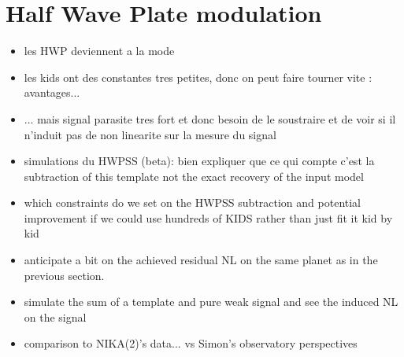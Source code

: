 
\section{Half Wave Plate modulation}

\begin{itemize}
\item les HWP deviennent a la mode
\item les kids ont des constantes tres petites, donc on peut faire tourner vite
  : avantages...
\item ... mais signal parasite tres fort et donc besoin de le soustraire et de
  voir si il n'induit pas de non linearite sur la mesure du signal
\item simulations du HWPSS (beta): bien expliquer que ce qui compte c'est la
  subtraction of this template not the exact recovery of the input model
\item which constraints do we set on the HWPSS subtraction and potential
  improvement if we could use hundreds of KIDS rather than just fit it kid by kid
\item anticipate a bit on the achieved residual NL on the same planet as in the
  previous section.
\item simulate the sum of a template and pure weak signal and see the induced NL
  on the signal
\item comparison to NIKA(2)'s data... vs Simon's observatory perspectives
\end{itemize}
